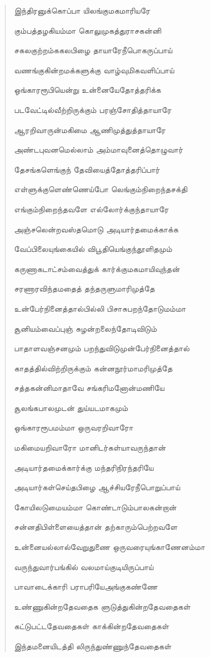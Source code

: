 \documentclass{article}
\begin{document}
\begin{quotation}
{இந்திரனுக்கொப்பா யிலங்குமகமாரியரே

கும்பத்தழகியம்மா கொலுமுகத்துராசகன்னி

சகலகுற்றம்ககலபிழை தாயாரேநீபொகருப்பாய்

வணங்குகின்றமக்களுக்கு வாழ்வுமிகவளிப்பாய்

ஒங்காரரூபியென்று உன்னையேதோத்தரிக்க

படவேட்டில்வீற்றிருக்கும் பரஞ்சோதித்தாயாரே

ஆரறிவாருன்மகிமை ஆணிமுத்துத்தாயாரே

அண்டபுவனமெல்லாம் அம்மாவுனைத்தொழுவார்

தேசங்களெங்குந் தேவியைத்தோத்தரிப்பார்

எள்ளுக்குளெண்ணெய்போ லெங்கும்நிறைந்தசக்தி

எங்கும்நிறைந்தவளே எல்லாேர்க்குந்தாயாரே

அஞ்சலென்றவஸ்தமொடு அடியார்தமைக்காக்க

வேப்பிலையுங்கையில் விபூதியெங்குந்தூளிதமும்

கருணாகடாட்சம்வைத்துக் கார்க்குமகமாயிவுந்தன்

சரணாரவிந்தமதைத் தந்தருளுமாரிமுத்தே

உன்பேர்நினைத்தால்பில்லி பிசாசுபறந்தோடுமம்மா

சூனியம்வைப்புஞ் சுழன்றலைந்தோடிவிடும்

பாதாளவஞ்சனமும் பறந்துவிடுமுன்பேர்நினைத்தால்

காதத்தில்விற்றிருக்கும்‌ கன்னநூர்மாமரிமுத்தே

சத்தகன்னிமாதாவே சங்கரிமனோன்மணியே

சூலங்கபாலமுடன் துய்யடமாகமும்

ஒங்காரரூபமம்மா ஒருவரறிவாரோ

மகிமையறிவாரோ மானிடர்கள்யாவருந்தான்

அடியார்தமைக்கார்க்கு மந்தரிநிரந்தரியே

அடியார்கள்செய்தபிழை ஆச்சியரேநீபொறுப்பாய்

கோயிலடுமையம்மா கொண்டாடும்பாலகன்றான்

சன்னதிபிள்ளையைத்தான் தற்காரும்பெற்றவளே

உன்னையல்லால்வேறுதுணை ஒருவரையுங்காணேனம்மா

வருந்துவார்பங்கில் வலமாய்குடியிருப்பாய்

பாவாடைக்காரி பராபரியேஅங்குகண்ணே

உண்ணுகின்றதேவதைக ளுடுத்துகின்றதேவதைகள்

கட்டுபட்டதேவதைகள் காக்கின்றதேவதைகள்

இந்தமனையிடத்தி லிருந்துண்ணுந்தேவதைகள்

}
\end{quotation}
\end{document}
